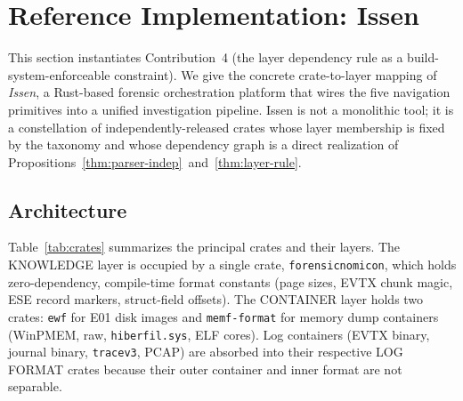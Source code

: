 \section{Reference Implementation: Issen}
\label{sec:implementation}

This section instantiates Contribution~4 (the layer dependency rule as a
build-system-enforceable constraint). We give the concrete crate-to-layer
mapping of \emph{Issen}, a Rust-based forensic orchestration platform
that wires the five navigation primitives into a unified investigation
pipeline. Issen is not a monolithic tool; it is a constellation of
independently-released crates whose layer membership is fixed by the
taxonomy and whose dependency graph is a direct realization of
Propositions~\ref{thm:parser-indep}~and~\ref{thm:layer-rule}.

\subsection{Architecture}

Table~\ref{tab:crates} summarizes the principal crates and their layers.
The KNOWLEDGE layer is occupied by a single crate, \texttt{forensicnomicon},
which holds zero-dependency, compile-time format constants (page sizes,
EVTX chunk magic, ESE record markers, struct-field offsets). The CONTAINER
layer holds two crates: \texttt{ewf} for E01 disk images and
\texttt{memf-format} for memory dump containers (WinPMEM, raw,
\texttt{hiberfil.sys}, ELF cores). Log containers (EVTX binary, journal
binary, \texttt{tracev3}, PCAP) are absorbed into their respective LOG
FORMAT crates because their outer container and inner format are not
separable.

